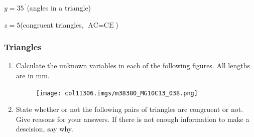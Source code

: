 \begin{table}[H]
{\begin{mdframed}[linewidth=4, leftmargin=40, rightmargin=40]
\begin{exercise}
\begin{enumerate}[noitemsep, label=\textbf{Step} \textbf{\arabic*}. ]
      \par 
      \label{m38380*id1166229837179}\begin{math}y={35}^{\ensuremath{{\,}^{\circ}}}\end{math}\hspace{1ex}(angles in a triangle)\par 
      \label{m38380*id1166228117285}\begin{math}z=5\end{math}\hspace{1ex}(congruent triangles, 
\begin{math}\text{AC}=\text{CE}\end{math})\par \end{enumerate}
        


    \end{exercise}
    \end{mdframed}
    }
    \noindent
\pagebreak
  \label{m38380*secfhsst!!!underscore!!!id824}
        \subsubsection{  Triangles }
        \nopagebreak
        
          \label{m38380*id318528}\begin{enumerate}[noitemsep, label=\textbf{\arabic*}. ] 
            \label{m38380*uid50}\item Calculate the unknown variables in each of the following figures. All
lengths are in mm.

    \setcounter{subfigure}{0}


	\begin{figure}[H] %
    \begin{center}
    \label{m38380*id318548!!!underscore!!!media}\label{m38380*id318548!!!underscore!!!printimage}\texttt{[image: col11306.imgs/m38380\_MG10C13\_038.png]} %
        
    
    \end{center}

 \end{figure}   

    \addtocounter{footnote}{-0}
            \label{m38380*uid51}\item State whether or not the following pairs of triangles are congruent or not.
Give reasons for your answers. If there is not enough information to make a
descision, say why.


\end{enumerate}
\end{table}
